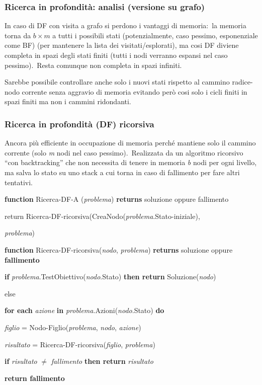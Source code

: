 \subsubsection{Ricerca in profondità: analisi (versione su grafo)}

In caso di DF con visita a grafo si perdono i vantaggi di memoria:\ la memoria torna da $b \times m$ a tutti i possibili stati (potenzialmente, caso pessimo, esponenziale come BF) (per mantenere la lista dei visitati/esplorati), ma cosi DF diviene completa in spazi degli stati finiti (tutti i nodi verranno espansi nel caso pessimo).\
Resta comunque non completa in spazi infiniti.\

Sarebbe possibile controllare anche solo i nuovi stati rispetto al cammino radice-nodo corrente senza aggravio di memoria evitando però cosi solo i cicli finiti in spazi finiti ma non i cammini ridondanti.

\subsubsection{Ricerca in profondità (DF) ricorsiva}

Ancora più efficiente in occupazione di memoria perché mantiene solo il cammino corrente (solo \textit{m} nodi nel caso pessimo).\
Realizzata da un algoritmo ricorsivo ``con backtracking'' che non necessita di tenere in memoria \textit{b} nodi per ogni livello, ma salva lo stato su uno stack a cui torna in caso di fallimento per fare altri tentativi.\

\begin{flushleft}
	\textbf{function} Ricerca-DF-A (\textit{problema}) \textbf{returns} soluzione oppure fallimento

	\quad return Ricerca-DF-ricorsiva(CreaNodo(\textit{problema}.Stato-iniziale),

	\qquad\textit{problema})
\end{flushleft}

\begin{flushleft}
	\textbf{function} Ricerca-DF-ricorsiva(\textit{nodo}, \textit{problema}) \textbf{returns} soluzione oppure \textbf{fallimento}

	\quad \textbf{if} \textit{problema}.TestObiettivo(\textit{nodo}.Stato) \textbf{then return} Soluzione(\textit{nodo})

	\quad else

	\quad \textbf{for each} \textit{azione} \textbf{in} \textit{problema}.Azioni(\textit{nodo}.Stato) \textbf{do}

	\quad \quad \quad \textit{figlio} = Nodo-Figlio(\textit{problema}, \textit{nodo}, \textit{azione})

	\qquad \quad \textit{risultato} = Ricerca-DF-ricorsiva(\textit{figlio}, \textit{problema})

	\qquad \quad \textbf{if} \textit{risultato} $\neq$ \textit{fallimento} \textbf{then return} \textit{risultato}

	\textbf{return fallimento}
\end{flushleft}

